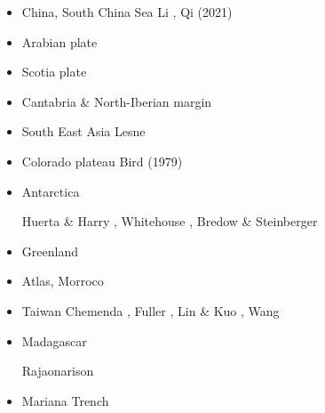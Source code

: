 \begin{itemize}
\item China, South China Sea
{\scriptsize
\cite{zhst10}
\cite{wazh15}
\cite{guyr16}
\cite{lixs19}
\cite{dawl20}
Li \etal \cite{lisy20},
Qi \etal (2021) \cite{qill21}
}
\item Arabian plate 
{\scriptsize
\cite{rerl15}
}
\item Scotia plate 
{\scriptsize
\cite{necb13}
\cite{vaga20}
\cite{vasv21}
}
\item Cantabria \& North-Iberian margin 
{\scriptsize
\cite{clbb02}
\cite{peap15}
}
\item South East Asia 
{\scriptsize
Lesne \etal \cite{lecd00}\\
\cite{rekv04}
\cite{yotr15}\cite{hasp15}\cite{meds15}
\cite{necg16}
}
\item Colorado plateau 
{\scriptsize
Bird (1979) \cite{bird79}
\cite{vabv10}
\cite{lesm11}
}
\item Antarctica  

\begin{scriptsize}
Huerta \& Harry \cite{huha07},
Whitehouse \etal \cite{whbl12},
Bredow \& Steinberger \cite{brst21}
\end{scriptsize}

\item Greenland  
{\scriptsize
\cite{stsj15}\cite{heps15}\cite{stbl19}
}
\item Atlas, Morroco  
{\scriptsize
\cite{mica12}
\cite{kava14}
}
\item Taiwan  
{\scriptsize
Chemenda \etal \cite{chys01}, Fuller \etal \cite{fuwf06}, Lin \& Kuo \cite{liku16},
Wang \etal \cite{wakz19}
}
\item Madagascar 
\begin{scriptsize}
\twothousandtwenty Rajaonarison \etal \cite{rasf20} 
\end{scriptsize}

\item Mariana Trench  
{\scriptsize
\cite{zhlb15}
}


\end{itemize}
